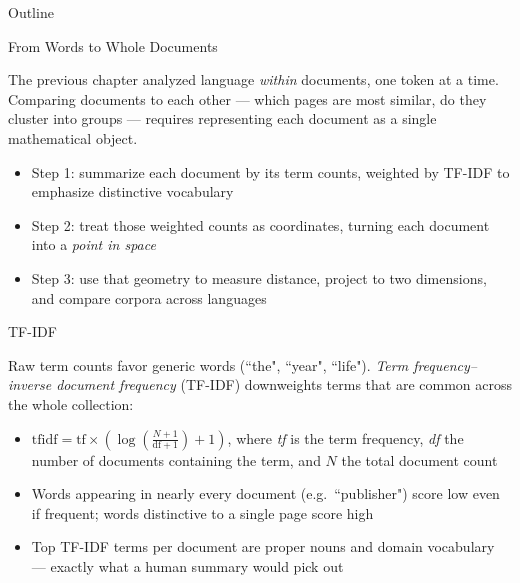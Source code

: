 \documentclass[8pt,aspectratio=169]{beamer}
\begin{document}
\begin{outlineframe}{Outline}
\end{outlineframe}

\begin{textframe}{From Words to Whole Documents}

The previous chapter analyzed language \textit{within} documents, one token at a time. Comparing documents to each other --- which pages are most similar, do they cluster into groups --- requires representing each document as a single mathematical object.

\begin{itemize}
\item Step 1: summarize each document by its term counts, weighted by TF-IDF to emphasize distinctive vocabulary
\item Step 2: treat those weighted counts as coordinates, turning each document into a \textit{point in space}
\item Step 3: use that geometry to measure distance, project to two dimensions, and compare corpora across languages
\end{itemize}

\end{textframe}

\begin{textframe}{TF-IDF}

Raw term counts favor generic words (``the", ``year", ``life"). \textit{Term frequency--inverse document frequency} (TF-IDF) downweights terms that are common across the whole collection:

\begin{itemize}
\item $\text{tfidf} = \text{tf} \times \left(\log\left(\frac{N+1}{\text{df}+1}\right) + 1\right)$, where \textit{tf} is the term frequency, \textit{df} the number of documents containing the term, and $N$ the total document count
\item Words appearing in nearly every document (e.g.\ ``publisher") score low even if frequent; words distinctive to a single page score high
\item Top TF-IDF terms per document are proper nouns and domain vocabulary --- exactly what a human summary would pick out
\end{itemize}

\end{textframe}
\end{document}
